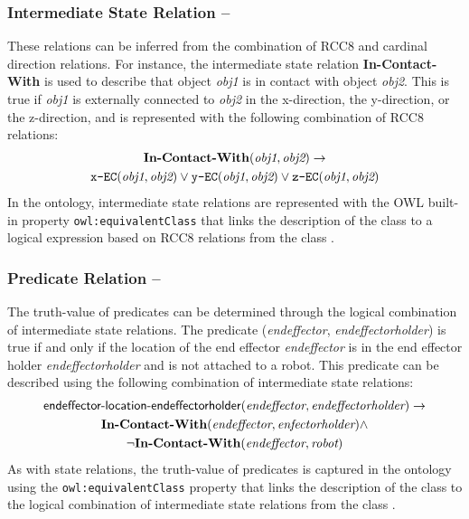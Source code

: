 \subsubsection{Intermediate State Relation --}
These relations can be inferred from the combination of RCC8 and cardinal direction relations. For  instance, the intermediate state relation \textbf{In-Contact-With} is used to describe that object \textit{obj1} is in contact with object \textit{obj2}. This is true if \textit{obj1} is externally connected to \textit{obj2} in the x-direction, the y-direction, or the z-direction,  and is represented with the following combination of RCC8 relations:
\begin{gather}
\textbf{In-Contact-With}(\textit{obj1}, \textit{obj2}) \rightarrow   \notag\\
\texttt{x-EC}(\textit{obj1}, \textit{obj2}) \vee \texttt{y-EC}(\textit{obj1}, \textit{obj2}) \vee \texttt{z-EC}(\textit{obj1},\textit{obj2}) \notag
\end{gather}
In the ontology, intermediate state relations are represented with the OWL built-in property \texttt{owl:equivalentClass} that links the description of the class  to a logical expression based on RCC8 relations from the class .
\subsubsection{Predicate Relation --} The truth-value of predicates can be determined through the logical combination of intermediate state relations. The predicate (\textit{endeffector}, \textit{endeffectorholder}) is true if and only if the location of the end effector \textit{endeffector} is in the end effector holder \textit{endeffectorholder} and is not attached to a robot. This predicate can be described using the following combination of intermediate state relations:
\begin{gather}
\textsf{endeffector-location-endeffectorholder}(\textit{endeffector},\textit{endeffectorholder}) \rightarrow   \notag\\
\textbf{In-Contact-With}(\textit{endeffector}, \textit{enfectorholder}) \wedge \notag\\
\neg\textbf{In-Contact-With}(\textit{endeffector}, \textit{robot}) \notag
\end{gather}
As with state relations, the truth-value of predicates is captured in the ontology using the \texttt{owl:equivalentClass} property that links the description of the class  to the logical combination of intermediate state relations from the class .

